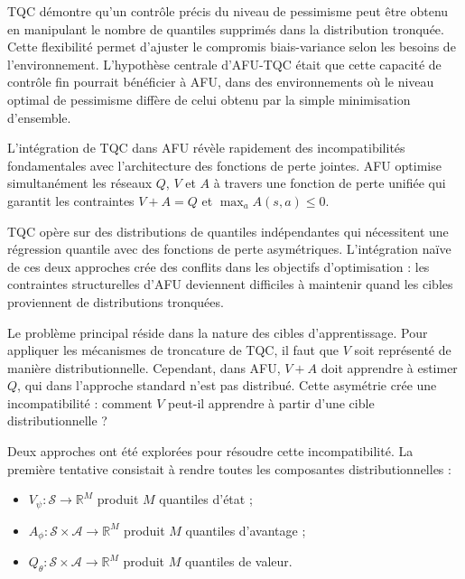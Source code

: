 \documentclass[a4paper, 12pt]{report}
\begin{document}
    TQC démontre qu'un contrôle précis du niveau de pessimisme peut être obtenu
    en manipulant le nombre de quantiles supprimés dans la distribution
    tronquée. Cette flexibilité permet d'ajuster le compromis
    biais-variance selon les besoins de l'environnement. L'hypothèse centrale
    d'AFU-TQC était que cette capacité de contrôle fin pourrait bénéficier à
    AFU, dans des environnements où le niveau optimal de pessimisme diffère de
    celui obtenu par la simple minimisation d'ensemble.

    L'intégration de TQC dans AFU révèle rapidement des incompatibilités
    fondamentales avec l'architecture des fonctions de perte jointes. AFU
    optimise simultanément les réseaux $Q$, $V$ et $A$ à travers une fonction
    de perte unifiée qui garantit les contraintes $V + A = Q$ et $\max_a A(s,a)
    \leq 0$.

    TQC opère sur des distributions de quantiles indépendantes
    qui nécessitent une régression quantile avec des fonctions de perte
    asymétriques. L'intégration naïve de ces deux approches crée des conflits
    dans les objectifs d'optimisation : les contraintes structurelles d'AFU
    deviennent difficiles à maintenir quand les cibles proviennent de
    distributions tronquées.

    Le problème principal réside dans la nature des cibles d'apprentissage.
    Pour appliquer les mécanismes de troncature de TQC, il faut que $V$ soit
    représenté de manière distributionnelle. Cependant, dans AFU, $V + A$ doit
    apprendre à estimer $Q$, qui dans l'approche standard n'est pas distribué.
    Cette asymétrie crée une incompatibilité : comment $V$ peut-il apprendre à
    partir d'une cible distributionnelle ?

    Deux approches ont été explorées pour résoudre cette incompatibilité. La
    première tentative consistait à rendre toutes les composantes
    distributionnelles :

    \begin{itemize}
      \item $V_\psi : \mathcal{S} \rightarrow \mathbb{R}^M$ produit $M$ quantiles d'état ;
      \item $A_\phi : \mathcal{S} \times \mathcal{A} \rightarrow \mathbb{R}^M$ produit $M$ quantiles d'avantage ;
      \item $Q_\theta : \mathcal{S} \times \mathcal{A} \rightarrow \mathbb{R}^M$ produit $M$ quantiles de valeur.
    \end{itemize}
\end{document}
